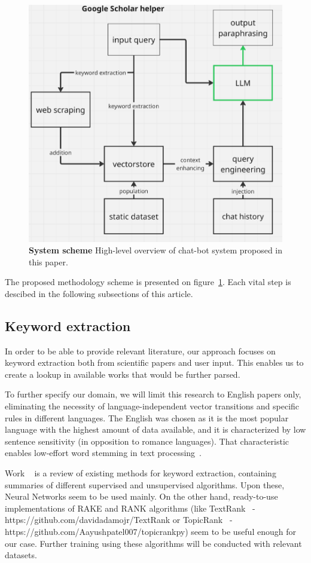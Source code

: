 \documentclass[fleqn,moreauthors,10pt]{ds_report}
\begin{document}
\begin{figure}[ht]\centering 
	\includegraphics[width=0.7\linewidth]{images/scheme.png}
	\caption{\textbf{System scheme} High-level overview of chat-bot system proposed in this paper.}
	\label{fig:scheme}
\end{figure}

The proposed methodology scheme is presented on figure~\ref{fig:scheme}. Each vital step is descibed in the following subsections of this article.

\subsection*{Keyword extraction}

In order to be able to provide relevant literature, our approach focuses on keyword extraction both from scientific papers and user input. This enables us to create a lookup in available works that would be further parsed.

To further specify our domain, we will limit this research to English papers only, eliminating the necessity of language-independent vector transitions and specific rules in different languages. The English was chosen as it is the most popular language with the highest amount of data available, and it is characterized by low sentence sensitivity (in opposition to romance languages). That characteristic enables low-effort word stemming in text processing~\cite{turney2000learning}.

Work ~\cite{siddiqi2015keyword} is a review of existing methods for keyword extraction, containing summaries of different supervised and unsupervised algorithms. Upon these, Neural Networks seem to be used mainly. On the other hand, ready-to-use implementations of RAKE and RANK algorithms (like TextRank~\cite{textrank} - https://github.com/davidadamojr/TextRank or TopicRank~\cite{bougouin2013topicrank} - https://github.com/Aayushpatel007/topicrankpy) seem to be useful enough for our case. Further training using these algorithms will be conducted with relevant datasets.
\end{document}
